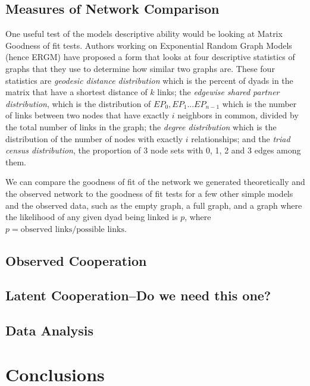 \documentclass[12pt,onesided,fullpage]{amsart}
\begin{document}
\subsection{Measures of Network Comparison}
One useful test of the models descriptive ability would be looking at Matrix Goodness of fit tests. Authors working on Exponential Random Graph Models (hence ERGM) have proposed a form that looks at four descriptive statistics of graphs that they use to determine how similar two graphs are. These four statistics are \emph{geodesic distance distribution} which is the percent of dyads in the matrix that have a shortest distance of $k$ links; the \emph{edgewise shared partner distribution}, which is the distribution of $EP_0, EP_1...EP_{n-1}$ which is the number of links between two nodes that have exactly $i$ neighbors in common, divided by the total number of links in the graph; the \emph{degree distribution} which is the distribution of the number of nodes with exactly $i$ relationships; and the \emph{triad census distribution}, the proportion of 3 node sets with 0, 1, 2 and 3 edges among them.

We can compare the goodness of fit of the network we generated theoretically and the observed network to the goodness of fit tests for a few other simple models and the observed data, such as the empty graph, a full graph, and a graph where the likelihood of any given dyad being linked is $p$, where $p = \text{observed links}/\text{possible links}$.

\subsection{Observed Cooperation}
\subsection{Latent Cooperation--Do we need this one?}
\subsection{Data Analysis}

\section{Conclusions}
\end{document}
